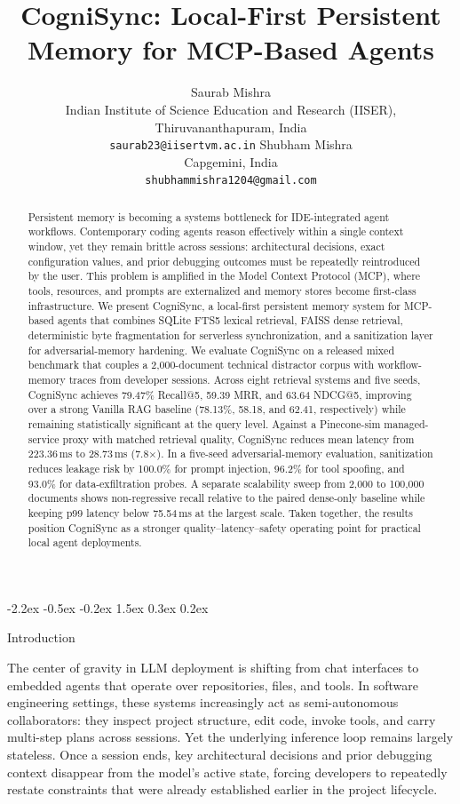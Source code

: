 \documentclass{article}
\title{CogniSync: Local-First Persistent Memory for MCP-Based Agents}
\author{%
  Saurab Mishra \\
  Indian Institute of Science Education and Research (IISER), Thiruvananthapuram, India \\
  \texttt{saurab23@iisertvm.ac.in}
  \And
  Shubham Mishra \\
  Capgemini, India \\
  \texttt{shubhammishra1204@gmail.com}
}
\makeatletter
\renewcommand{\section}{%
  \@startsection{section}{1}{\z@}%
                {-2.2ex \@plus -0.5ex \@minus -0.2ex}%
                { 1.5ex \@plus  0.3ex \@minus  0.2ex}%
                {\large\bf\raggedright}%
}
\makeatother
\begin{document}
\maketitle

\begin{abstract}
Persistent memory is becoming a systems bottleneck for IDE-integrated agent workflows. Contemporary coding agents reason effectively within a single context window, yet they remain brittle across sessions: architectural decisions, exact configuration values, and prior debugging outcomes must be repeatedly reintroduced by the user. This problem is amplified in the Model Context Protocol (MCP), where tools, resources, and prompts are externalized and memory stores become first-class infrastructure. We present CogniSync, a local-first persistent memory system for MCP-based agents that combines SQLite FTS5 lexical retrieval, FAISS dense retrieval, deterministic byte fragmentation for serverless synchronization, and a sanitization layer for adversarial-memory hardening. We evaluate CogniSync on a released mixed benchmark that couples a 2,000-document technical distractor corpus with workflow-memory traces from developer sessions. Across eight retrieval systems and five seeds, CogniSync achieves 79.47\% Recall@5, 59.39 MRR, and 63.64 NDCG@5, improving over a strong Vanilla RAG baseline (78.13\%, 58.18, and 62.41, respectively) while remaining statistically significant at the query level. Against a Pinecone-sim managed-service proxy with matched retrieval quality, CogniSync reduces mean latency from 223.36\,ms to 28.73\,ms (7.8$\times$). In a five-seed adversarial-memory evaluation, sanitization reduces leakage risk by 100.0\% for prompt injection, 96.2\% for tool spoofing, and 93.0\% for data-exfiltration probes. A separate scalability sweep from 2,000 to 100,000 documents shows non-regressive recall relative to the paired dense-only baseline while keeping p99 latency below 75.54\,ms at the largest scale. Taken together, the results position CogniSync as a stronger quality--latency--safety operating point for practical local agent deployments.
\end{abstract}

\section{Introduction}

The center of gravity in LLM deployment is shifting from chat interfaces to embedded agents that operate over repositories, files, and tools. In software engineering settings, these systems increasingly act as semi-autonomous collaborators: they inspect project structure, edit code, invoke tools, and carry multi-step plans across sessions. Yet the underlying inference loop remains largely stateless. Once a session ends, key architectural decisions and prior debugging context disappear from the model's active state, forcing developers to repeatedly restate constraints that were already established earlier in the project lifecycle.
\end{document}
